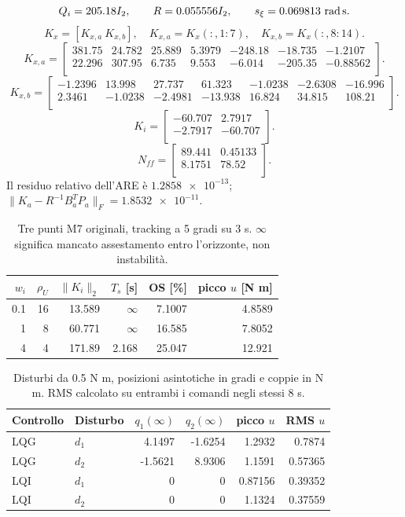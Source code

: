 \[
Q_i=205.18I_2,\qquad R=0.055556I_2,\qquad s_\xi=0.069813\ {\rm rad\,s}.
\]
\[
K_x=[K_{x,a}\ K_{x,b}],\quad K_{x,a}=K_x(:,1{:}7),\quad K_{x,b}=K_x(:,8{:}14).
\]
\[K_{x,a}=\begin{bmatrix}
381.75 & 24.782 & 25.889 & 5.3979 & -248.18 & -18.735 & -1.2107 \\
22.296 & 307.95 & 6.735 & 9.553 & -6.014 & -205.35 & -0.88562 \\
\end{bmatrix}.\]
\[K_{x,b}=\begin{bmatrix}
-1.2396 & 13.998 & 27.737 & 61.323 & -1.0238 & -2.6308 & -16.996 \\
2.3461 & -1.0238 & -2.4981 & -13.938 & 16.824 & 34.815 & 108.21 \\
\end{bmatrix}.\]
\[K_i=\begin{bmatrix}
-60.707 & 2.7917 \\
-2.7917 & -60.707 \\
\end{bmatrix}.\]
\[N_{ff}=\begin{bmatrix}
89.441 & 0.45133 \\
8.1751 & 78.52 \\
\end{bmatrix}.\]
Il residuo relativo dell'ARE è $\num{1.2858e-13}$; $\|K_a-R^{-1}B_a^TP_a\|_F=\num{1.8532e-11}$.
\begin{table}[htbp]\centering\small
\begin{tabular}{rrrrrr}\toprule
$w_i$ & $\rho_U$ & $\|K_i\|_2$ & $T_s$ [s] & OS [\%] & picco $u$ [N m] \\\midrule
0.1 & 16 & 13.589 & \(\infty\) & 7.1007 & 4.8589 \\
1 & 8 & 60.771 & \(\infty\) & 16.585 & 7.8052 \\
4 & 4 & 171.89 & 2.168 & 25.047 & 12.921 \\
\bottomrule\end{tabular}
\caption{Tre punti M7 originali, tracking a 5 gradi su 3 s. $\infty$ significa mancato assestamento entro l'orizzonte, non instabilità.}
\label{tab:lqi-tre-punti}\end{table}
\begin{table}[htbp]\centering\small
\begin{tabular}{llrrrr}\toprule
Controllo & Disturbo & $q_1(\infty)$ & $q_2(\infty)$ & picco $u$ & RMS $u$ \\\midrule
LQG & $d_1$ & 4.1497 & -1.6254 & 1.2932 & 0.7874 \\
LQG & $d_2$ & -1.5621 & 8.9306 & 1.1591 & 0.57365 \\
LQI & $d_1$ & 0 & 0 & 0.87156 & 0.39352 \\
LQI & $d_2$ & 0 & 0 & 1.1324 & 0.37559 \\
\bottomrule\end{tabular}
\caption{Disturbi da 0.5 N m, posizioni asintotiche in gradi e coppie in N m. RMS calcolato su entrambi i comandi negli stessi 8 s.}
\label{tab:lqi-disturbo-numeri}\end{table}
